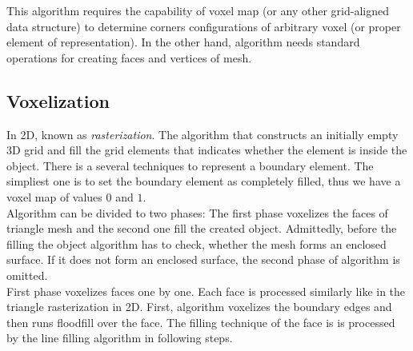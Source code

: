 This algorithm requires the capability of voxel map (or any other grid-aligned data structure) to
determine corners configurations of arbitrary voxel (or proper element of representation). In the other
hand, algorithm needs standard operations for creating faces and vertices of mesh.

\subsection{Voxelization}

In 2D, known as \emph{rasterization}. The algorithm that constructs an initially empty 3D grid and fill 
the
grid elements that indicates whether the element is inside the object. There is a several techniques
to represent a boundary element. The simpliest one is to set the boundary element as completely filled, 
thus we have a voxel map of values $0$ and $1$.\\

Algorithm can be divided to two phases: The first phase voxelizes the faces of triangle mesh and the
second one fill the created object. Admittedly, before the filling the object algorithm has to check,
whether the mesh forms an enclosed surface. If it does not form an enclosed surface, the second phase of
algorithm is omitted.\\

First phase voxelizes faces one by one. Each face is processed similarly like in the triangle 
rasterization in 2D.
First, algorithm voxelizes the boundary edges and then runs floodfill over the face. The filling
technique of the face is is processed by the line filling algorithm in following steps. 

